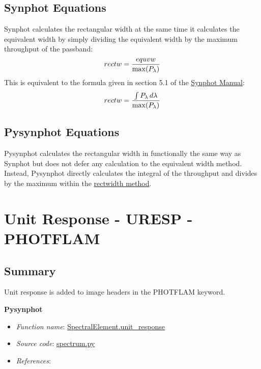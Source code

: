 \documentclass[letterpaper,10pt,english]{sphinxtsr}
\begin{document}
\section{Synphot Equations}
\label{main:id13}
Synphot calculates the rectangular width at the same time it calculates the
equivalent width by simply dividing the equivalent width by the maximum
throughput of the passband:
\begin{gather}
\begin{split}rectw = \frac{equvw}{\max(P_{\lambda})}\end{split}\notag
\end{gather}
This is equivalent to the formula given in section 5.1 of the \href{http://stsdas.stsci.edu/stsci\_python\_epydoc/SynphotManual.pdf}{Synphot Manual}:
\begin{gather}
\begin{split}rectw = \frac{\int P_{\lambda}\,d\lambda}{\max(P_{\lambda})}\end{split}\notag
\end{gather}

\section{Pysynphot Equations}
\label{main:id14}
Pysynphot calculates the rectangular width in functionally the same way as
Synphot but does not defer any calculation to the equivalent width method.
Instead, Pysynphot directly calculates the integral of the throughput and
divides by the maximum within the \href{https://trac.assembla.com/astrolib/browser/trunk/pysynphot/lib/pysynphot/spectrum.py\#L1109}{rectwidth method}.


\chapter{Unit Response - URESP - PHOTFLAM}
\label{main:unit-response-uresp-photflam}

\section{Summary}
\label{main:id15}
Unit response is added to image headers in the PHOTFLAM keyword.

\textbf{Pysynphot}
\begin{itemize}
\item {} 
\emph{Function name}: \href{https://trac.assembla.com/astrolib/browser/trunk/pysynphot/lib/pysynphot/spectrum.py\#L1429}{SpectralElement.unit\_response}

\item {} 
\emph{Source code}: \href{https://trac.assembla.com/astrolib/browser/trunk/pysynphot/lib/pysynphot/spectrum.py}{spectrum.py}

\item {} 
\emph{References}:

\end{itemize}
\end{document}
